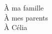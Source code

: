 \thispagestyle{empty}

\vspace*{5cm}
\begin{flushright}
	\sffamily
		À ma famille\\
		À mes parents\\
		À Célia
\end{flushright}
